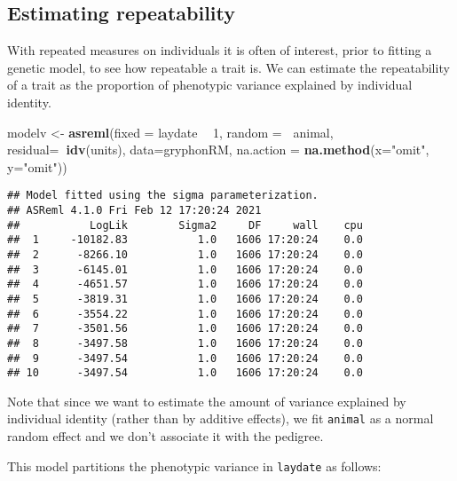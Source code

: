 \documentclass[12pt,]{book}
\newenvironment{Shaded}{\begin{snugshade}}{\end{snugshade}}
\newcommand{\DataTypeTok}[1]{\textcolor[rgb]{0.13,0.29,0.53}{#1}}
\newcommand{\DecValTok}[1]{\textcolor[rgb]{0.00,0.00,0.81}{#1}}
\newcommand{\KeywordTok}[1]{\textcolor[rgb]{0.13,0.29,0.53}{\textbf{#1}}}
\newcommand{\NormalTok}[1]{#1}
\newcommand{\OperatorTok}[1]{\textcolor[rgb]{0.81,0.36,0.00}{\textbf{#1}}}
\newcommand{\StringTok}[1]{\textcolor[rgb]{0.31,0.60,0.02}{#1}}
\begin{document}
\hypertarget{estimating-repeatability}{%
\subsection{Estimating repeatability}\label{estimating-repeatability}}

With repeated measures on individuals it is often of interest, prior to fitting a genetic model, to see how repeatable a trait is. We can estimate the repeatability of a trait as the proportion of phenotypic variance explained by individual identity.

\begin{Shaded}
\begin{Highlighting}[]
\NormalTok{modelv <-}\StringTok{ }\KeywordTok{asreml}\NormalTok{(}\DataTypeTok{fixed =}\NormalTok{ laydate }\OperatorTok{~}\StringTok{ }\DecValTok{1}\NormalTok{,}
                 \DataTypeTok{random =}\OperatorTok{~}\StringTok{ }\NormalTok{animal,}
                 \DataTypeTok{residual=}\OperatorTok{~}\KeywordTok{idv}\NormalTok{(units),}
                 \DataTypeTok{data=}\NormalTok{gryphonRM,}
                 \DataTypeTok{na.action =} \KeywordTok{na.method}\NormalTok{(}\DataTypeTok{x=}\StringTok{"omit"}\NormalTok{, }\DataTypeTok{y=}\StringTok{"omit"}\NormalTok{))}
\end{Highlighting}
\end{Shaded}

\begin{verbatim}
## Model fitted using the sigma parameterization.
## ASReml 4.1.0 Fri Feb 12 17:20:24 2021
##           LogLik        Sigma2     DF     wall    cpu
##  1     -10182.83           1.0   1606 17:20:24    0.0
##  2      -8266.10           1.0   1606 17:20:24    0.0
##  3      -6145.01           1.0   1606 17:20:24    0.0
##  4      -4651.57           1.0   1606 17:20:24    0.0
##  5      -3819.31           1.0   1606 17:20:24    0.0
##  6      -3554.22           1.0   1606 17:20:24    0.0
##  7      -3501.56           1.0   1606 17:20:24    0.0
##  8      -3497.58           1.0   1606 17:20:24    0.0
##  9      -3497.54           1.0   1606 17:20:24    0.0
## 10      -3497.54           1.0   1606 17:20:24    0.0
\end{verbatim}

Note that since we want to estimate the amount of variance explained by individual identity (rather than by additive effects), we fit \texttt{animal} as a normal random effect and we don't associate it with the pedigree.

This model partitions the phenotypic variance in \texttt{laydate} as follows:
\end{document}
